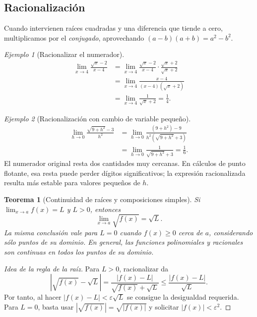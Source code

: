 \documentclass[12pt]{article}
\newtheorem{teorema}[definicion]{Teorema}
\theoremstyle{remark}
\newtheorem{ejemplo}{Ejemplo}
\begin{document}
\subsection*{Racionalización}
Cuando intervienen raíces cuadradas y una diferencia que tiende a cero, multiplicamos por el \emph{conjugado}, aprovechando $ (a-b)(a+b)=a^2-b^2$.

\begin{ejemplo}[Racionalizar el numerador]
\begin{align*}
\lim_{x\to4}\frac{\sqrt{x}-2}{x-4}
 &=\lim_{x\to4}\frac{\sqrt{x}-2}{x-4}\cdot\frac{\sqrt{x}+2}{\sqrt{x}+2}\\
 &=\lim_{x\to4}\frac{x-4}{(x-4)(\sqrt{x}+2)}\\
 &=\lim_{x\to4}\frac1{\sqrt{x}+2}=\boxed{\frac14}.
\end{align*}
\end{ejemplo}

\begin{ejemplo}[Racionalización con cambio de variable pequeño]
\begin{align*}
\lim_{h\to0}\frac{\sqrt{9+h^2}-3}{h^2}
 &=\lim_{h\to0}\frac{(9+h^2)-9}{h^2(\sqrt{9+h^2}+3)}\\
 &=\lim_{h\to0}\frac1{\sqrt{9+h^2}+3}=\boxed{\frac16}.
\end{align*}
El numerador original resta dos cantidades muy cercanas. En cálculos de punto flotante, esa resta puede perder dígitos significativos; la expresión racionalizada resulta más estable para valores pequeños de $h$.
\end{ejemplo}


\begin{teorema}[Continuidad de raíces y composiciones simples]
Si $\lim_{x\to a}f(x)=L$ y $L>0$, entonces
\[
 \lim_{x\to a}\sqrt{f(x)}=\sqrt L.
\]
La misma conclusión vale para $L=0$ cuando $f(x)\ge0$ cerca de $a$, considerando sólo puntos de su dominio. En general, las funciones polinomiales y racionales son continuas en todos los puntos de su dominio.
\end{teorema}

\begin{proof}[Idea de la regla de la raíz]
Para $L>0$, racionalizar da
\[
 |\sqrt{f(x)}-\sqrt L|=\frac{|f(x)-L|}{\sqrt{f(x)}+\sqrt L}\le\frac{|f(x)-L|}{\sqrt L}.
\]
Por tanto, al hacer $|f(x)-L|<\varepsilon\sqrt L$ se consigue la desigualdad requerida. Para $L=0$, basta usar $|\sqrt{f(x)}|=\sqrt{|f(x)|}$ y solicitar $|f(x)|<\varepsilon^2$.
\end{proof}
\end{document}
